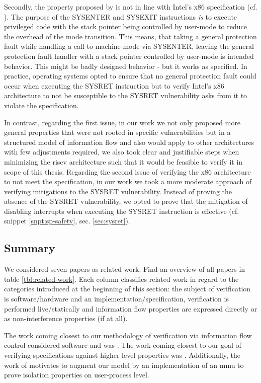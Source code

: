 Secondly, the property proposed by \citeauthor{BradfieldS16} is not in line with Intel's x86 specification (cf. \cite{Dunlap19}).
The purpose of the SYSENTER and SYSEXIT instructions \textit{is} to execute privileged code with the stack pointer being controlled by user-mode to reduce the overhead of the mode transition.
This means, that taking a general protection fault while handling a call to machine-mode via SYSENTER, leaving the general protection fault handler with a stack pointer controlled by user-mode is intended behavior.
This might be badly designed behavior - but it works as specified.
In practice, operating systems opted to ensure that no general protection fault could occur when executing the SYSRET instruction but to verify Intel's x86 architecture to not be susceptible to the SYSRET vulnerability asks from it to violate the specification.

In contrast, regarding the first issue, in our work we not only proposed more general properties that were not rooted in specific vulnerabilities but in a structured model of information flow and also would apply to other architectures with few adjustments required, we also took clear and justifiable steps when minimizing the \gls{riscv} architecture such that it would be feasible to verify it in scope of this thesis.
Regarding the second issue of verifying the x86 architecture to not meet the specification, in our work we took a more moderate approach of verifying mitigations to the SYSRET vulnerability.
Instead of proving the absence of the SYSRET vulnerability, we opted to prove that the mitigation of disabling interrupts when executing the SYSRET instruction is effective (cf. snippet \ref{snpt:sp-safety}, sec. \ref{sec:sysret}).

\subsection{Summary}

We considered seven papers as related work.
Find an overview of all papers in table \ref{tbl:related-work}.
Each column classifies related work in regard to the categories introduced at the beginning of this section: the subject of verification is software/hardware and an implementation/specification, verification is performed live/statically and information flow properties are expressed directly or as non-interference properties (if at all).

The work coming closest to our methodology of verification via information flow control considered software and was \cite{GordonKPGNR15,SuhLZD04}.
The work coming closest to our goal of verifying specifications against higher level properties was \cite{Fox02,KhakpourSD13,BradfieldS16}.
Additionally, the work of \cite{SuhLZD04,KhakpourSD13} motivates to augment our model by an implementation of an \gls{mmu} to prove isolation properties on user-process level.

